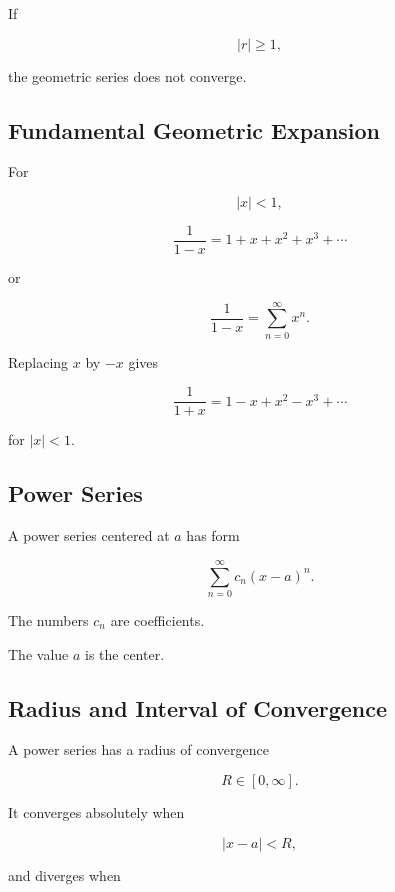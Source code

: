 If

\[
|r|\geq1,
\]

the geometric series does not converge.

\subsection{Fundamental Geometric Expansion}
\label{subsec:fundamental-geometric-expansion}

For

\[
|x|<1,
\]

\[
\boxed{
\frac{1}{1-x}
=
1+x+x^2+x^3+\cdots
}
\]

or

\[
\boxed{
\frac{1}{1-x}
=
\sum_{n=0}^{\infty}x^n.
}
\]

Replacing \(x\) by \(-x\) gives

\[
\boxed{
\frac{1}{1+x}
=
1-x+x^2-x^3+\cdots
}
\]

for \(|x|<1\).

\subsection{Power Series}
\label{subsec:power-series-reference}

A power series centered at \(a\) has form

\[
\boxed{
\sum_{n=0}^{\infty}
c_n(x-a)^n.
}
\]

The numbers \(c_n\) are coefficients.

The value \(a\) is the center.

\subsection{Radius and Interval of Convergence}
\label{subsec:radius-interval-convergence-reference}

A power series has a radius of convergence

\[
\boxed{
R\in[0,\infty].
}
\]

It converges absolutely when

\[
\boxed{
|x-a|<R,
}
\]

and diverges when

